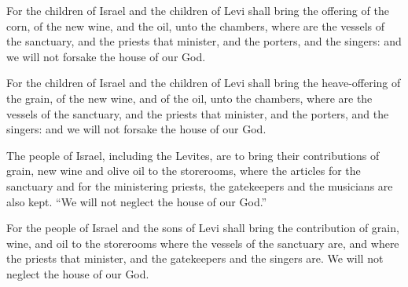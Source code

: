 			For the children of Israel and the children of Levi shall bring the offering of the corn, of the new wine, and the oil, unto the chambers, where are the vessels of the sanctuary, and the priests that minister, and the porters, and the singers: and we will not forsake the house of our God.

			\begin{versebox}
					\item[BHS] 
					\item[LXX] 
					\item[ASV] For the children of Israel and the children of Levi shall bring the heave-offering of the grain, of the new wine, and of the oil, unto the chambers, where are the vessels of the sanctuary, and the priests that minister, and the porters, and the singers: and we will not forsake the house of our God.
					\item[NIV] The people of Israel, including the Levites, are to bring their contributions of grain, new wine and olive oil to the storerooms, where the articles for the sanctuary and for the ministering priests, the gatekeepers and the musicians are also kept. “We will not neglect the house of our God.”
					\item[NRSV] For the people of Israel and the sons of Levi shall bring the contribution of grain, wine, and oil to the storerooms where the vessels of the sanctuary are, and where the priests that minister, and the gatekeepers and the singers are. We will not neglect the house of our God.
			\end{versebox}
